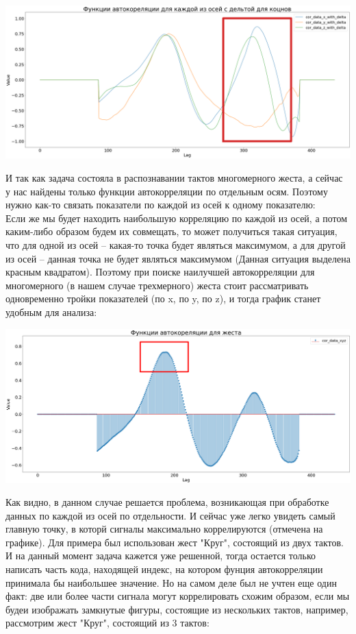 \documentclass[a4paper]{article}
\begin{document}
\includegraphics[scale = 0.17]{cor_data_x_y_z_with_delta.png}

И так как задача состояла в распознавании тактов многомерного жеста, а сейчас у нас найдены только функции автокорреляции по отдельным осям. Поэтому нужно как-то связать показатели по каждой из осей к одному показателю: \\
Если же мы будет находить наибольшую корреляцию по каждой из осей, а потом каким-либо образом будем их совмещать, то может получиться такая ситуация, что для одной из осей -- какая-то точка будет являться максимумом, а для другой из осей -- данная точка не будет являться максимумом (Данная ситуация выделена красным квадратом).
Поэтому при поиске наилучшей автокорреляции для многомерного (в нашем случае трехмерного) жеста стоит рассматривать одновременно тройки показателей (по x, по y, по z), и тогда график станет удобным для анализа:

\includegraphics[scale = 0.17]{cor_data_xyz.png}

Как видно, в данном случае решается проблема, возникающая при обработке данных по каждой из осей по отдельности. И сейчас уже легко увидеть самый главную точку, в которй сигналы максимально коррелируются (отмечена на графике).
Для примера был использован жест "Круг", состоящий из двух тактов.
И на данный момент задача кажется уже решенной, тогда остается только написать часть кода, находящей индекс, на котором фунция автокорреляции принимала бы наибольшее значение.
Но на самом деле был не учтен еще один факт: две или более части сигнала могут коррелировать схожим образом, если мы будеи изображать замкнутые фигуры, состоящие из нескольких тактов, например, рассмотрим жест "Круг", состоящий из 3 тактов:
\end{document}
